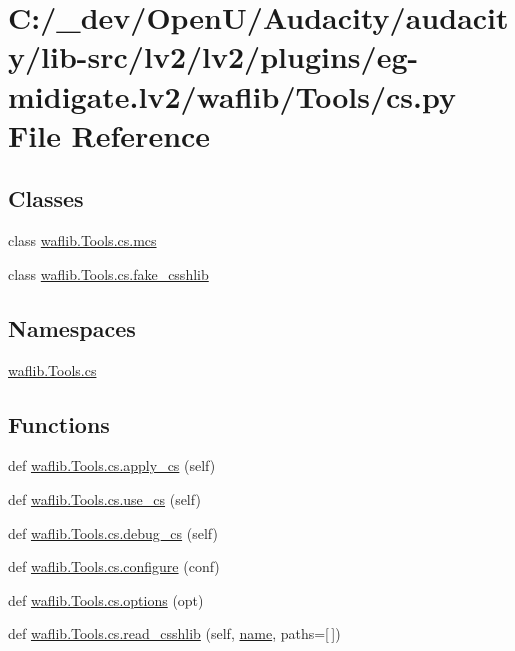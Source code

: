 \hypertarget{lv2_2plugins_2eg-midigate_8lv2_2waflib_2_tools_2cs_8py}{}\section{C\+:/\+\_\+dev/\+Open\+U/\+Audacity/audacity/lib-\/src/lv2/lv2/plugins/eg-\/midigate.lv2/waflib/\+Tools/cs.py File Reference}
\label{lv2_2plugins_2eg-midigate_8lv2_2waflib_2_tools_2cs_8py}
\subsection*{Classes}
\begin{DoxyCompactItemize}
\item 
class \hyperlink{classwaflib_1_1_tools_1_1cs_1_1mcs}{waflib.\+Tools.\+cs.\+mcs}
\item 
class \hyperlink{classwaflib_1_1_tools_1_1cs_1_1fake__csshlib}{waflib.\+Tools.\+cs.\+fake\+\_\+csshlib}
\end{DoxyCompactItemize}
\subsection*{Namespaces}
\begin{DoxyCompactItemize}
\item 
 \hyperlink{namespacewaflib_1_1_tools_1_1cs}{waflib.\+Tools.\+cs}
\end{DoxyCompactItemize}
\subsection*{Functions}
\begin{DoxyCompactItemize}
\item 
def \hyperlink{namespacewaflib_1_1_tools_1_1cs_a27e68865096cf54da13a1d0d563bd4c2}{waflib.\+Tools.\+cs.\+apply\+\_\+cs} (self)
\item 
def \hyperlink{namespacewaflib_1_1_tools_1_1cs_a2962c0e94d37d4610f58b0e4911fbd9f}{waflib.\+Tools.\+cs.\+use\+\_\+cs} (self)
\item 
def \hyperlink{namespacewaflib_1_1_tools_1_1cs_ae5dd9312be558c0712218cdab22724b4}{waflib.\+Tools.\+cs.\+debug\+\_\+cs} (self)
\item 
def \hyperlink{namespacewaflib_1_1_tools_1_1cs_a97849d425e4332772dd4982ae091360f}{waflib.\+Tools.\+cs.\+configure} (conf)
\item 
def \hyperlink{namespacewaflib_1_1_tools_1_1cs_a20f520fa6e5a8eb6b064f7c5c82be0e0}{waflib.\+Tools.\+cs.\+options} (opt)
\item 
def \hyperlink{namespacewaflib_1_1_tools_1_1cs_aa175024b17365922ae423f6846c3ca7f}{waflib.\+Tools.\+cs.\+read\+\_\+csshlib} (self, \hyperlink{lib_2expat_8h_a1b49b495b59f9e73205b69ad1a2965b0}{name}, paths=\mbox{[}$\,$\mbox{]})
\end{DoxyCompactItemize}
